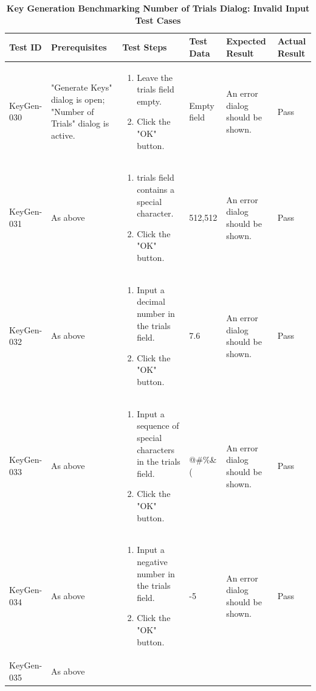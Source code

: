 \documentclass[]{final_report}
\theoremstyle{definition}
\begin{document}
\begin{longtable}{|p{1.5cm}|p{2.5cm}|p{3.5cm}|p{2.5cm}|p{3cm}|p{2cm}|}
  \caption{\textbf{Key Generation Benchmarking Number of Trials Dialog: Invalid Input Test Cases}} \\
  \hline
  \textbf{Test ID} & \textbf{Prerequisites} & \textbf{Test Steps} & \textbf{Test Data} & \textbf{Expected Result} & \textbf{Actual Result} \\
  \hline
  KeyGen-030 & "Generate Keys" dialog is open; "Number of Trials" dialog is active. & 
  \begin{enumerate}
  \item Leave the trials field empty.
  \item Click the "OK" button.
  \end{enumerate} & Empty field & An error dialog should be shown. & Pass \\
  \hline
  KeyGen-031 & As above & 
  \begin{enumerate}
  \item trials field contains a special character.
  \item Click the "OK" button.
  \end{enumerate} & 512,512 & An error dialog should be shown. & Pass \\
  \hline
  KeyGen-032 & As above & 
  \begin{enumerate}
  \item Input a decimal number in the trials field.
  \item Click the "OK" button.
  \end{enumerate} & 7.6 & An error dialog should be shown. & Pass \\
  \hline
  KeyGen-033 & As above & 
  \begin{enumerate}
  \item Input a sequence of special characters in the trials field.
  \item Click the "OK" button.
  \end{enumerate} & @\#\%\&\*(\ & An error dialog should be shown. & Pass \\
  \hline
  KeyGen-034 & As above & 
  \begin{enumerate}
  \item Input a negative number in the trials field.
  \item Click the "OK" button.
  \end{enumerate} & -5 & An error dialog should be shown. & Pass \\
  \hline
  KeyGen-035 & As above & 

\end{longtable}
\end{document}
